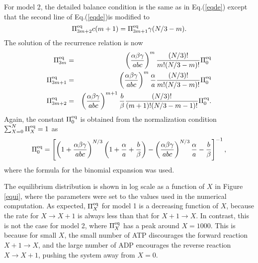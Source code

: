 \documentclass[aps,pre,amsmath,amssymb,floatfix,preprint,nofootinbib]{revtex4}
\begin{document}
For model 2, the detailed balance condition is the same as in Eq.(\ref{eqde}) except that the second line of Eq.(\ref{eqde})is modified to
\begin{equation}
\Pi^{\rm eq}_{3m+2} c(m+1) = \Pi^{\rm eq}_{3m+1} \gamma (N/3-m).
\end{equation}
The solution of the recurrence relation is now
\begin{eqnarray}
\Pi^{\rm eq}_{3m} &=& \left(\frac{\alpha\beta\gamma}{abc}\right)^m\frac{(N/3)!}{m! (N/3-m)!}\Pi^{\rm eq}_{0} \nonumber\\
\Pi^{\rm eq}_{3m+1} &=& \left(\frac{\alpha\beta\gamma}{abc}\right)^m\frac{\alpha}{a}\frac{(N/3)!}{m! (N/3-m)!}\Pi^{\rm eq}_{0} \nonumber\\
\Pi^{\rm eq}_{3m+2} &=& \left(\frac{\alpha\beta\gamma}{abc}\right)^{m+1} \frac{b}{\beta}\frac{(N/3)!}{(m+1)! (N/3-m-1)!}\Pi^{\rm eq}_{0} . \label{eqdi3}
\end{eqnarray}
Again, the constant $\Pi^{\rm eq}_{0}$ is obtained from the normalization condition $\sum_{X=0}^N \Pi^{\rm eq}_X = 1$ as
\begin{equation}
\Pi^{\rm eq}_{0}=\left[\left(1 +\frac{\alpha\beta\gamma}{abc}\right)^{N/3}\left(1+ \frac{\alpha}{a}+\frac{b}{\beta}\right)  -  \left(\frac{\alpha\beta\gamma}{abc}\right)^{N/3}\frac{\alpha}{a}   - \frac{b}{\beta}\right]^{-1}, \label{pino2}
\end{equation}
where the formula for the binomial expansion was used.

The equilibrium distribution is shown in log scale as a function of $X$ in Figure \ref{equi}, where the parameters were set to the values used in the numerical computation. As expected, $\Pi^{\rm eq}_X$ for model 1 is a decreasing function of $X$, because the rate for $X \to X+1$ is always less than that for $X+1 \to X$. In contrast, this is not the case for model 2, where $\Pi^{\rm eq}_X$ has a peak around $X=1000$. This is because for small $X$, the small number of ATP discourages the forward reaction $X+1 \to X$, and the large number of ADP encourages the reverse reaction $X \to X+1$, pushing the system away from $X=0$. 
\end{document}
